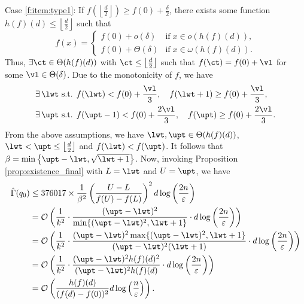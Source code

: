 \documentclass[onecolumn,letterpaper]{IEEEtran}
\newcommand{\cO}{{\cal O}}
\newcommand{\cTheta}{{\Theta}}
\newcommand{\cp}{{q}}
\newcommand{\up}{{U}}
\newcommand{\lw}{{L}}
\newcommand{\fgap}{{\delta}}
\newcommand{\fh}{{h(f)}}
\newcommand{\bet}{{\beta}}
\newcommand{\exifinal}{{ 376017 \times \frac{1}{\bet^2} \left( \frac{\up-\lw}{f(\up)-f(\lw)} \right)^2  d\log \left( \frac{2n}{\varepsilon } \right)}}
\newcommand{\ftaup}{{\hat{\Gamma}}}
\newcommand{\cpns}{\cp_0}
\newcommand{\fTpns}{\ftaup (\cpns)}
\begin{document}
Case \ref{f:item:type1}: If $f\left(\left\lfloor \frac {d} {2}\right \rfloor\right)\geq f(0)+\frac {\fgap}{2}$, 
there exists some function $\fh(d)\leq \left\lfloor \frac {d} {2}\right \rfloor$ such that 
\begin{equation} \label{eq:def:h}
    f(x) = 
    \left\{
    \begin{array}{ll}
    f(0)+ o(\fgap) & \text{if} \; x\in o(\fh(d)), \\
    f(0)+\cTheta(\fgap) & \text{if} \; x\in\omega(\fh(d)).
    \end{array} 
    \right.
\end{equation}
Thus, $\exists \ct\in\cTheta(\fh(d))$ with $\ct\leq  \left\lfloor \frac {d} {2}\right \rfloor$ such that $f(\ct)=f(0)+\vl$ for some $\vl \in \cTheta (\fgap)$. Due to the monotonicity of $f$, we have
\begin{align*}
    &\exists\, \lwt \text{ s.t. } f(\lwt) < f(0) + \frac{\vl}{3} ,\quad f(\lwt+1) \ge f(0) + \frac{\vl}{3}, \\ 
    &\exists\, \upt \text{ s.t. } f(\upt-1) < f(0) + \frac{2\vl}{3} ,\quad  f(\upt) \ge f(0) + \frac{2\vl}{3}.
\end{align*}
From the above assumptions, we have $\lwt,\upt \in\cTheta(\fh(d))$, $\lwt <\upt \leq \left\lfloor \frac {d} {2}\right \rfloor$ and $f(\lwt)<f(\upt)$. It follows that $\bet=\min\left\{ \upt-\lwt,\sqrt{\lwt+1}\right \}$. Now, invoking Proposition \ref{prop:existence_final} with $\lw=\lwt$ and $\up=\upt$, we have 
\begin{align*}
    \fTpns &\leq \exifinal \\
    &= \cO \left(\frac{1}{k^2} \cdot \frac{(\upt-\lwt)^2}{\min\{ (\upt-\lwt)^2,\lwt+1 \}} \cdot d \log\left(\frac{2n}{\varepsilon}\right) \right) \\ 
    &= \cO \left(\frac{1}{k^2} \cdot \frac{(\upt-\lwt)^2\max\{ (\upt-\lwt)^2,\lwt+1 \}}{(\upt-\lwt)^2(\lwt+1)} \cdot d \log\left(\frac{2n}{\varepsilon}\right) \right) \\ 
    &= \cO \left(\frac{1}{k^2} \cdot \frac{(\upt-\lwt)^2 \fh(d)^2}{(\upt-\lwt)^2 \fh(d)} \cdot d \log\left(\frac{2n}{\varepsilon}\right) \right) \\ 
    &= \cO \left( \frac{\fh(d)}{(f(d)-f(0))^2} d \log \left(\frac{n}{\varepsilon}\right) \right).
\end{align*}
\end{document}
